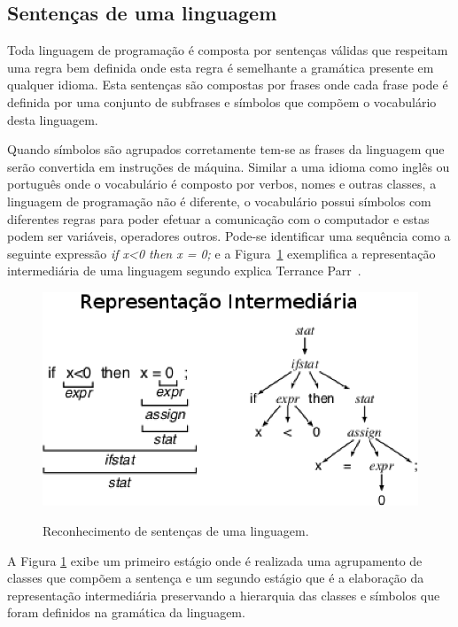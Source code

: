 \subsection{Sentenças de uma linguagem}
Toda linguagem de programação é composta por sentenças válidas que respeitam uma regra bem definida onde esta regra é semelhante a gramática presente em qualquer idioma.  Esta sentenças são compostas por frases onde cada frase pode é definida por uma conjunto de subfrases e símbolos que compõem o vocabulário desta linguagem. 

Quando símbolos são agrupados corretamente tem-se as frases da linguagem que serão convertida em instruções de máquina. Similar a uma idioma como inglês ou português onde o vocabulário é composto por verbos, nomes e outras classes, a linguagem de programação não é diferente, o vocabulário possui símbolos com diferentes regras para poder efetuar a comunicação com o computador e estas podem ser variáveis, operadores outros. Pode-se identificar uma sequência como a seguinte expressão \textit{if x<0 then x = 0;} e a Figura~\ref{fig:rep_intermediaria} exemplifica a representação intermediária de uma linguagem segundo explica Terrance Parr~\cite{Parr:2009:LIP:1823613}.

\begin{figure}[ht]
\centering
\includegraphics[scale=1]{Imagens/rep_intermediaria}
\label{fig:rep_intermediaria}
\caption{Reconhecimento de sentenças de uma linguagem.}
\end{figure}

A Figura \ref{fig:rep_intermediaria} exibe um primeiro estágio onde é realizada uma agrupamento de classes que compõem a sentença e um segundo estágio que é a elaboração da representação intermediária preservando a hierarquia das classes e símbolos que foram definidos na gramática da linguagem.


